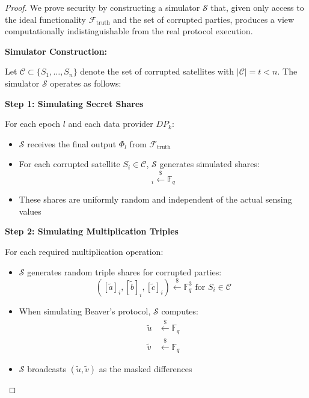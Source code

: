 \begin{proof}
We prove security by constructing a simulator $\mathcal{S}$ that, given only access to the ideal functionality $\mathcal{F}_{\text{truth}}$ and the set of corrupted parties, produces a view computationally indistinguishable from the real protocol execution.

\textbf{Simulator Construction:}

Let $\mathcal{C} \subset \{S_1, \ldots, S_n\}$ denote the set of corrupted satellites with $|\mathcal{C}| = t < n$. The simulator $\mathcal{S}$ operates as follows:

\textbf{Step 1: Simulating Secret Shares}

For each epoch $l$ and each data provider $DP_k$:
\begin{itemize}
    \item $\mathcal{S}$ receives the final output $\Phi_l$ from $\mathcal{F}_{\text{truth}}$
    \item For each corrupted satellite $S_i \in \mathcal{C}$, $\mathcal{S}$ generates simulated shares:
    \begin{equation}
    [\tilde{x}_l^k]_i \xleftarrow{\$} \mathbb{F}_q
    \end{equation}
    \item These shares are uniformly random and independent of the actual sensing values
\end{itemize}

\textbf{Step 2: Simulating Multiplication Triples}

For each required multiplication operation:
\begin{itemize}
    \item $\mathcal{S}$ generates random triple shares for corrupted parties:
    \begin{equation}
    ([\tilde{a}]_i, [\tilde{b}]_i, [\tilde{c}]_i) \xleftarrow{\$} \mathbb{F}_q^3 \text{ for } S_i \in \mathcal{C}
    \end{equation}
    \item When simulating Beaver's protocol, $\mathcal{S}$ computes:
    \begin{align}
    \tilde{u} &\xleftarrow{\$} \mathbb{F}_q \\
    \tilde{v} &\xleftarrow{\$} \mathbb{F}_q
    \end{align}
    \item $\mathcal{S}$ broadcasts $(\tilde{u}, \tilde{v})$ as the masked differences
\end{itemize}


\end{proof}
